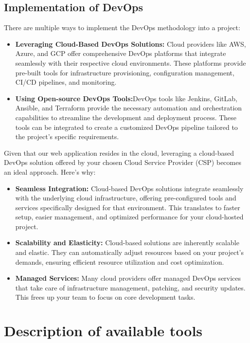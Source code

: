 \subsection{Implementation of DevOps}
There are multiple ways to implement the DevOps methodology into a project:
\begin{itemize}
    \item \textbf{Leveraging Cloud-Based DevOps Solutions:}     Cloud providers like AWS, Azure, and GCP offer comprehensive DevOps platforms that integrate seamlessly with their respective cloud environments. These platforms provide pre-built tools for infrastructure provisioning, configuration management, CI/CD pipelines, and monitoring.
    \item \textbf{Using Open-source DevOps Tools:}DevOps tools like Jenkins, GitLab, Ansible, and Terraform provide the necessary automation and orchestration capabilities to streamline the development and deployment process. These tools can be integrated to create a customized DevOps pipeline tailored to the project's specific requirements.
\end{itemize}
Given that our web application resides in the cloud, leveraging a cloud-based DevOps solution offered by your chosen Cloud Service Provider (CSP) becomes an ideal approach. Here's why:
\begin{itemize}
    \item \textbf{Seamless Integration:} Cloud-based DevOps solutions integrate seamlessly with the underlying cloud infrastructure, offering pre-configured tools and services specifically designed for that environment. This translates to faster setup, easier management, and optimized performance for your cloud-hosted project.
    \item \textbf{Scalability and Elasticity:} Cloud-based solutions are inherently scalable and elastic. They can automatically adjust resources based on your project's demands, ensuring efficient resource utilization and cost optimization.
    \item \textbf{Managed Services:} Many cloud providers offer managed DevOps services that take care of infrastructure management, patching, and security updates. This frees up your team to focus on core development tasks.
\end{itemize}

\section{Description of available tools}

